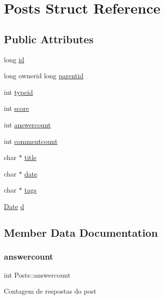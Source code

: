 \hypertarget{structPosts}{}\section{Posts Struct Reference}
\label{structPosts}
\subsection*{Public Attributes}
\begin{DoxyCompactItemize}
\item 
long \hyperlink{structPosts_a41fa23f741404a41f9bd985a435ced89}{id}
\item 
long ownerid long \hyperlink{structPosts_aeb658e93ff47e9251e216aa070985980}{parentid}
\item 
int \hyperlink{structPosts_ae539b56e598f13b797e3789122bbc86e}{typeid}
\item 
int \hyperlink{structPosts_a11d27a2452a5d95ee2260707efb76e78}{score}
\item 
int \hyperlink{structPosts_a6bc8821c265c069ab99aeaaa9eef1d21}{answercount}
\item 
int \hyperlink{structPosts_ac7ab7dae8264cd68e24106b55e3ce131}{commentcount}
\item 
char $\ast$ \hyperlink{structPosts_aa07892a7ecfb96794d258ea8aeba0c22}{title}
\item 
char $\ast$ \hyperlink{structPosts_a6cf5527c41212066350cf9da9986ea88}{date}
\item 
char $\ast$ \hyperlink{structPosts_a53b0e6aa6d0e047171ef3cf32b6b3d5d}{tags}
\item 
\hyperlink{structdates}{Date} \hyperlink{structPosts_aefbb21d741b93e29ab7472ee7eead3e3}{d}
\end{DoxyCompactItemize}


\subsection{Member Data Documentation}
\mbox{\label{structPosts_a6bc8821c265c069ab99aeaaa9eef1d21}} 
\subsubsection{\texorpdfstring{answercount}{answercount}}
{\footnotesize\ttfamily int Posts\+::answercount}

Contagem de respostas do post \mbox{\label{structPosts_ac7ab7dae8264cd68e24106b55e3ce131}} 
